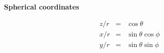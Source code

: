 {\bf Spherical coordinates}

\begin{eqnarray}
z/r & = & \cos \theta \\
x/r & = & \sin \theta \cos \phi \\
y/r & = & \sin \theta \sin \phi
\end{eqnarray}

